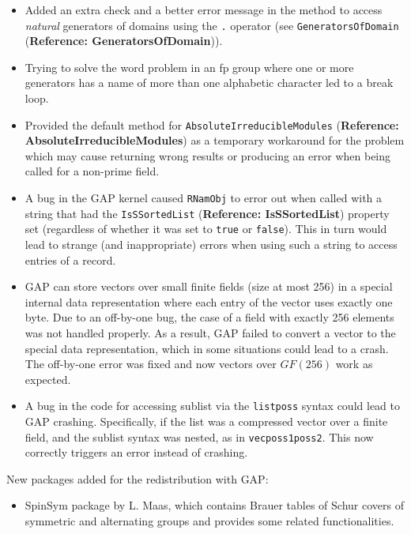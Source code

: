 \documentclass[a4paper,11pt]{report}
\begin{document}
{{\begin{itemize}
\item  Added an extra check and a better error message in the method to access \emph{natural} generators of domains using the \texttt{.} operator (see \texttt{GeneratorsOfDomain} (\textbf{Reference: GeneratorsOfDomain})). 
\item  Trying to solve the word problem in an fp group where one or more generators
has a name of more than one alphabetic character led to a break loop. 
\item  Provided the default method for \texttt{AbsoluteIrreducibleModules} (\textbf{Reference: AbsoluteIrreducibleModules}) as a temporary workaround for the problem which may cause returning wrong
results or producing an error when being called for a non-prime field. 
\item  A bug in the \textsf{GAP} kernel caused \texttt{RNamObj} to error out when called with a string that had the \texttt{IsSSortedList} (\textbf{Reference: IsSSortedList}) property set (regardless of whether it was set to \texttt{true} or \texttt{false}). This in turn would lead to strange (and inappropriate) errors when using
such a string to access entries of a record. 
\item  \textsf{GAP} can store vectors over small finite fields (size at most 256) in a special
internal data representation where each entry of the vector uses exactly one
byte. Due to an off-by-one bug, the case of a field with exactly 256 elements
was not handled properly. As a result, \textsf{GAP} failed to convert a vector to the special data representation, which in some
situations could lead to a crash. The off-by-one error was fixed and now
vectors over $GF(256)$ work as expected. 
\item  A bug in the code for accessing sublist via the \texttt{list\texttt{}poss\texttt{}} syntax could lead to \textsf{GAP} crashing. Specifically, if the list was a compressed vector over a finite
field, and the sublist syntax was nested, as in \texttt{vec\texttt{}poss1\texttt{}\texttt{}poss2\texttt{}}. This now correctly triggers an error instead of crashing. 
\end{itemize}
 New packages added for the redistribution with \textsf{GAP}: 
\begin{itemize}
\item  \textsf{SpinSym} package by L. Maas, which contains Brauer tables of Schur covers of symmetric
and alternating groups and provides some related functionalities. 
\end{itemize}
 }

}
\end{document}
